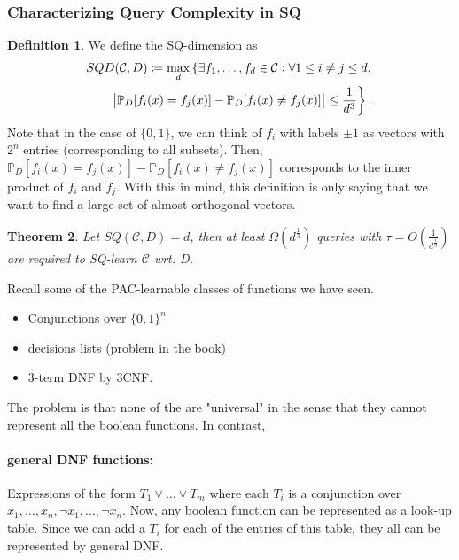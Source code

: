 \documentclass[12pt, letterpaper]{article}
\numberwithin{equation}{section} %
\newcommand{\mb}{\mathbb}
\newcommand{\mc}{\mathcal}
\newtheorem{theorem}{Theorem}[section]
\theoremstyle{definition}
\newtheorem{definition}[theorem]{Definition}
\theoremstyle{remark}
\begin{document}
\subsubsection{Characterizing Query Complexity in SQ}
\begin{definition}
We define the SQ-dimension as
\begin{multline}
SQD(\mc C, D) \coloneqq \max_d \left\{ \exists f_1,\ldots,f_d\in \mc C : \forall 1\leq i \ne j\leq d,\right.\\
\quad\quad \left.\abs{\mb P_D[f_i(x)=f_j(x)] - \mb P_D[f_i(x)\ne f_j(x)]}\leq \frac1{d^3}\right\}.
\end{multline}
Note that in the case of $\lbrace 0, 1\rbrace$, we can think of $f_i$ with labels $\pm 1$ as vectors with $2^n$ entries (corresponding to all subsets). Then, $\mb P_D[f_i(x)=f_j(x)]  - \mb P_D[f_i(x)\ne f_j(x)]$ corresponds to the inner product of $f_i$ and $f_j$. With this in mind, this definition is only saying that we want to find a large set of almost orthogonal vectors.
\end{definition}

\begin{theorem}
Let $SQ(\mc C, D)=d$, then at least $\Omega\left(d^\frac13\right)$ queries with $\tau = O\left(\frac1{d^\frac13}\right)$ are required to SQ-learn $\mc C$ wrt. D.
\end{theorem}

Recall some of the PAC-learnable classes of functions we have seen.
\begin{itemize}
\item Conjunctions over $\lbrace 0, 1\rbrace^n$
\item decisions lists (problem in the book)
\item 3-term DNF by 3CNF.
\end{itemize}
The problem is that none of the are "universal" in the sense that they cannot represent all the boolean functions. In contrast, 
\paragraph{general DNF functions:} Expressions of the form $T_1\lor\ldots\lor T_m$ where each $T_i$ is a conjunction over $x_1,\ldots,x_n,\lnot x_1,\ldots,\lnot x_n$. Now, any boolean function can be represented as a look-up table. Since we can add a $T_i$ for each of the entries of this table, they all can be represented by general DNF.
\end{document}
